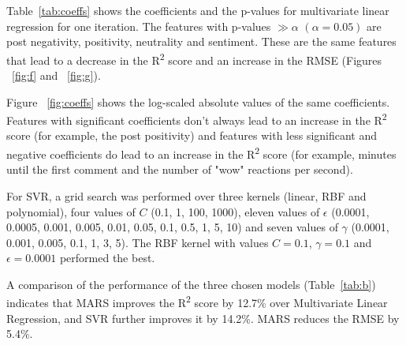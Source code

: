 \documentclass[twoside]{article}
\begin{document}
\begin{multicols}{2}
Table~\ref{tab:coeffs} shows the coefficients and the p-values for multivariate linear regression for one iteration. The features with p-values $\gg \alpha$ $(\alpha = 0.05)$ are post negativity, positivity, neutrality and sentiment. These are the same features that lead to a decrease in the R\textsuperscript{2} score and an increase in the RMSE (Figures ~\ref{fig:f} and ~\ref{fig:g}). 

Figure ~\ref{fig:coeffs} shows the log-scaled absolute values of the same coefficients. Features with significant coefficients don't always lead to an increase in the R\textsuperscript{2} score (for example, the post positivity) and features with less significant and negative coefficients do lead to an increase in the R\textsuperscript{2} score (for example, minutes until the first comment and the number of "wow" reactions per second). 

For SVR, a grid search was performed over three kernels (linear, RBF and polynomial), four values of $C$ (0.1, 1, 100, 1000), eleven values of $\epsilon$ (0.0001, 0.0005, 0.001, 0.005, 0.01, 0.05, 0.1, 0.5, 1, 5, 10) and seven values of $\gamma$ (0.0001, 0.001, 0.005, 0.1, 1, 3, 5). The RBF kernel with values $C=0.1$, $\gamma=0.1$ and $\epsilon=0.0001$ performed the best. 

A comparison of the performance of the three chosen models (Table~\ref{tab:b}) indicates that MARS improves the R\textsuperscript{2} score by 12.7\% over Multivariate Linear Regression, and SVR further improves it by 14.2\%. MARS reduces the RMSE by 5.4\%.
\end{multicols}
\end{document}
